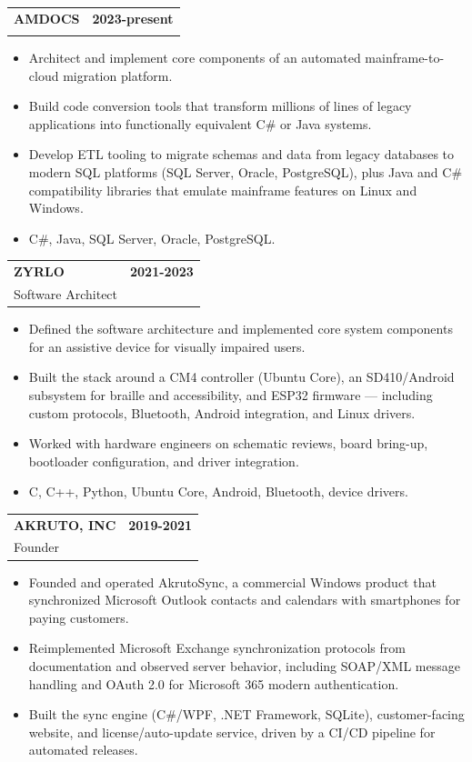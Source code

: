 \documentclass[11pt]{article}
\makeatletter
\newcommand{\IF}[2]{\iftoggle{#1}{#2}{}}
\newcommand{\IFELSE}[3]{\iftoggle{#1}{#2}{#3}}
\newcommand{\jobheading}[4]{%
  \vspace{4pt}\begin{tabularx}{\textwidth}{@{}X r@{}}
    {\textbf{#1}} & {\textbf{#2}} \\
    {{\normalsize #3}\hspace{0.5em}{\color{muted}·}\hspace{0.5em}{\color{muted}#4}} & {} \\
  \end{tabularx}\vspace{0pt}
}
\makeatother
\begin{document}
\jobheading{AMDOCS}{2023-present}{\IFELSE{MF}{Mainframe Modernization Engineer}{Cloud Migration Engineer, Platform \& Tooling}}{Remote}
\begin{itemize}
\item Architect and implement core components of an automated mainframe-to-cloud migration platform.
\item Build code conversion tools that transform millions of lines of legacy \IF{MF}{COBOL, JCL, and CICS }applications into functionally equivalent C\# or Java systems.
\item Develop ETL tooling to migrate schemas and data from legacy databases\IF{MF}{ (DB2, ADABAS, IDMS)} to modern SQL platforms (SQL Server, Oracle, PostgreSQL), plus Java and C\# compatibility libraries that emulate mainframe features on Linux and Windows.
\item C\#, Java, SQL Server, Oracle, PostgreSQL.
\end{itemize}

\jobheading{ZYRLO}{2021-2023}{Software Architect}{Sudbury, MA}
\begin{itemize}
\item Defined the software architecture and implemented core system components for an assistive device for visually impaired users.
\item Built the stack around a CM4 controller (Ubuntu Core), an SD410/Android subsystem for braille and accessibility, and ESP32 firmware --- including custom protocols, Bluetooth, Android integration, and Linux drivers.
\item Worked with hardware engineers on schematic reviews, board bring-up, bootloader configuration, and driver integration.
\item C, C++, Python, Ubuntu Core, Android, Bluetooth, device drivers.
\end{itemize}

\jobheading{AKRUTO, INC}{2019-2021}{Founder}{Needham, MA}
\begin{itemize}
\item Founded and operated AkrutoSync, a commercial Windows product that synchronized Microsoft Outlook contacts and calendars with smartphones for paying customers.
\item Reimplemented Microsoft Exchange synchronization protocols from documentation and observed server behavior, including SOAP/XML message handling and OAuth 2.0 for Microsoft 365 modern authentication.
\item Built the sync engine (C\#/WPF, .NET Framework, SQLite), customer-facing website, and license/auto-update service, driven by a CI/CD pipeline for automated releases.
\end{itemize}
\end{document}
